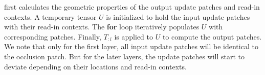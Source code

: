 \begin{algorithm}
\end{algorithm}



 first calculates the geometric properties of the output update patches and read-in contexts. A temporary tensor $U$ is initialized to hold the input update patches with their read-in contexts. The \textbf{for} loop iteratively populates $U$ with corresponding patches. Finally, $T_{:l}$ is applied to $U$ to compute the output patches. We note that only for the first layer, all input update patches will be identical to the occlusion patch. But for the later layers, the update patches will start to deviate depending on their locations and read-in contexts.


